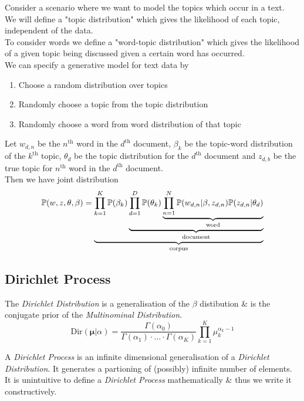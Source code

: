 \documentclass[11pt,a4paper]{article}
\begin{document}
Consider a scenario where we want to model the topics which occur in a text.\\
We will define a "topic distribution" which gives the likelihood of each topic, independent of the data.\\
To consider words we define a "word-topic distribution" which gives the likelihood of a given topic being discussed given a certain word has occurred.\\
We can specify a generative model for text data by
\begin{enumerate}[label=\roman*)]
	\item Choose a random distribution over topics
	\item Randomly choose a topic from the topic distribution
	\item Randomly choose a word from word distribution of that topic
\end{enumerate}
Let $w_{d,n}$ be the $n^\text{th}$ word in the $d^\text{th}$ document, $\beta_k$ be the topic-word distribution of the $k^\text{th}$ topic, $\theta_d$ be the topic distribution for the $d^\text{th}$ document and $z_{d,b}$ be the true topic for $n^\text{th}$ word in the $d^\text{th}$ document.\\
Then we have joint distribution
$$\mathbb{P}(w,z,\theta,\beta)=\underbrace{\prod_{k=1}^K\mathbb{P}(\beta_k)\underbrace{\prod_{d=1}^D\mathbb{P}(\theta_k)\underbrace{\prod_{n=1}^N\mathbb{P}(w_{d,n}|\beta,z_{d,n})\mathbb{P}(z_{d,n}|\theta_d)}_{\text{word}}}_{\text{document}}}_{\text{corpus}}$$

\subsection{Dirichlet Process}

The \textit{Dirichlet Distribution} is a generalisation of the $\beta$ distibution \& is the conjugate prior of the \textit{Multinominal Distribution}.
$$\text{Dir}(\pmb{\mu}|\alpha)=\frac{\Gamma(\alpha_0)}{\Gamma(\alpha_1)\cdot\dots\cdot\Gamma(\alpha_K)}\prod_{k=1}^K\mu_k^{\alpha_{k}-1}$$

A \textit{Dirichlet Process} is an infinite dimensional generalisation of a \textit{Dirichlet Distribution}. It generates a partioning of (possibly) infinite number of elements. It is unintuitive to define a \textit{Dirichlet Process} mathematically \& thus we write it constructively.\\
\end{document}
